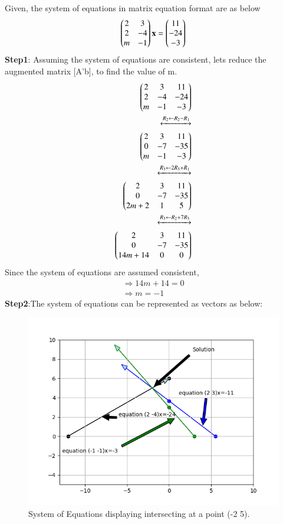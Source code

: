 Given, the system of equations in matrix equation format are as below
\begin{align}
\begin{pmatrix}2 & 3\\2 & -4\\m & -1\end{pmatrix}
\mathbf{x}=
\begin{pmatrix}11\\-24\\-3\end{pmatrix}
\end{align}
\textbf{Step1}: Assuming the system of equations are consistent, lets reduce the  augmented matrix [A'b], to find the value of m.
\begin{align}
\begin{split}
\begin{pmatrix}2 & 3 & 11\\2 & -4 & -24\\m & -1 & -3\end{pmatrix}\\
\xleftrightarrow[]{R_2 \leftarrow {R_2-R_1}}\\
\begin{pmatrix}2 & 3 & 11\\0 & -7 & -35\\m & -1 & -3\end{pmatrix}\\
\xleftrightarrow []{R_3\leftarrow {2R_3+R_1}}\\
\begin{pmatrix}2 & 3 & 11\\0 & -7 & -35\\2m+2 & 1 & 5\end{pmatrix}\\
\xleftrightarrow []{R_3\leftarrow {R_2+7R_3}}\\
\begin{pmatrix}2 & 3 & 11\\0 & -7 & -35\\14m+14 & 0 & 0\end{pmatrix}
\end{split}
\end{align}
Since the system of equations are assumed consistent,
\begin{equation}\label{eq:solutions/line_plane/17finaleq}
\begin{split}
\Rightarrow 14m+14 = 0\\
\Rightarrow m=-1
\end{split}
\end{equation}
\textbf{Step2}:The system of equations can be represented as vectors as below:
\begin{figure}
  \includegraphics[width=\linewidth]{./solutions/line_plane/17/assignment1solution_graph1.png}
  \caption{System of Equations displaying intersecting at a point (-2 5).}
  \label{eq:solutions/line_plane/17fig:graph1}
\end{figure}
